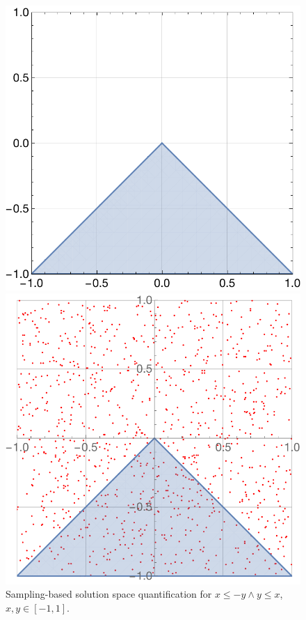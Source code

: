 \begin{figure}[t]
\centering
\begin{minipage}[b]{0.45\linewidth}
\includegraphics[width=1\linewidth]{plot_sampling01}
\end{minipage}
\quad
\begin{minipage}[b]{0.45\linewidth}
\includegraphics[width=1\linewidth]{plot_sampling02}
\end{minipage}
\caption{Sampling-based solution space quantification for $x \leq -y \land y \leq x$, $x, y \in [-1, 1]$.}
\label{fig:sampling-based}
\end{figure}

